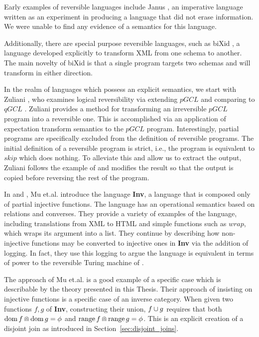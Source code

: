 Early examples of reversible languages include Janus \cite{lutz1986janus}, an imperative language
written as an experiment in producing a language that did not erase information. We were unable to
find any evidence of a semantics for this language.

Additionally, there are special purpose reversible languages, such as biXid \cite{bixid06}, a
language developed explicitly to transform XML \cite{xml} from one schema to another. The main
novelty of biXid is that a single program targets two schemas and will transform in either direction.

In the realm of languages which possess an explicit semantics, we start with Zuliani
\cite{zuliani01:reversibility}, who examines logical reversibility via extending $pGCL$
\cite{MorganIver99} and comparing to $qGCL$ \cite{sanders:quantum}. Zuliani provides a method for
transforming an irreversible $pGCL$ program into a reversible one. This is accomplished via an
application of expectation transform semantics to the $pGCL$ program. Interestingly, partial
programs are specifically excluded from the definition of reversible programs. The initial
definition of a reversible program is strict, i.e., the program is equivalent to $skip$
which does nothing. To alleviate this and allow us to extract the output, Zuliani follows the example of
\cite{bennett:1973reverse} and modifies the result so that the output is copied before reversing the
rest of the program.

In \cite{mu06bidirectional} and \cite{muetal04:injreversible}, Mu et.al. introduce the language
\textbf{Inv}, a language that is composed only of partial injective functions. The language has an
operational semantics based on relations and converses. They provide a variety of examples of the
language, including translations from XML to HTML and simple functions such as $wrap$, which wraps
its argument into a list. They continue by describing how non-injective functions may be converted to
injective ones in \textbf{Inv} via the addition of logging. In fact, they use this logging to argue
the language is equivalent in terms of power to the reversible Turing machine of
\cite{bennett:1973reverse}.

The approach of Mu et.al. is a good example of a specific case which is describable by the theory
presented in this Thesis. Their approach of insisting on injective functions is a specific case of
an inverse category. When given two functions $f,g$ of \textbf{Inv}, constructing their union,
$f\cup g$ requires that both $\operatorname*{dom} f \Cap \operatorname*{dom} g = \phi$ and $\operatorname*{range} f \Cap \operatorname*{range} g =
\phi$. This is an explicit creation of a disjoint join as introduced in
Section~\ref{sec:disjoint_joins}.

